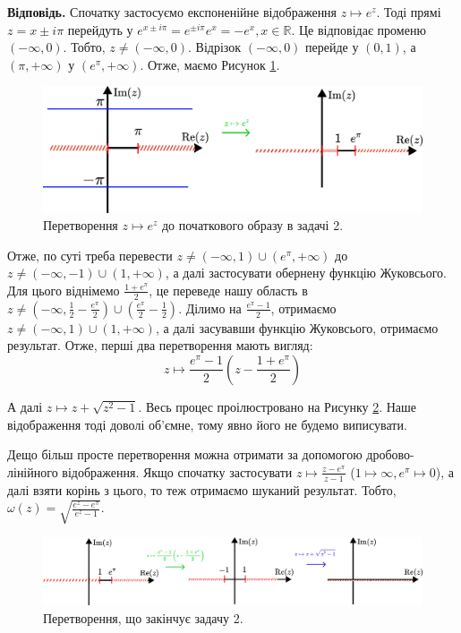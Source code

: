 \documentclass[oneside,solution]{karazin-complan-assign}
\begin{document}
\textbf{Відповідь.} Спочатку застосуємо експоненійне відображення $z \mapsto e^z$. Тоді прямі $z=x\pm i\pi$ перейдуть у $e^{x \pm i\pi} = e^{\pm i\pi}e^x=-e^x, x \in \mathbb{R}$. Це відповідає променю $(-\infty,0)$. Тобто, $z \neq (-\infty,0)$. Відрізок $(-\infty, 0)$ перейде у $(0,1)$, а $(\pi,+\infty)$ у $(e^{\pi},+\infty)$. Отже, маємо Рисунок \ref{fig:2(1)}.

\begin{figure}
    \centering
    \includegraphics[width=\textwidth]{images/test_2/plot_2_1.pdf}
    \caption{Перетворення $z \mapsto e^z$ до початкового образу в задачі 2.}
    \label{fig:2(1)}
\end{figure}

Отже, по суті треба перевести $z \neq (-\infty, 1) \cup (e^{\pi},+\infty)$ до $z \neq (-\infty,-1) \cup (1,+\infty)$, а далі застосувати обернену функцію Жуковсього. Для цього віднімемо $\frac{1+e^{\pi}}{2}$, це переведе нашу область в $z \neq (-\infty, \frac{1}{2}-\frac{e^{\pi}}{2}) \cup (\frac{e^{\pi}}{2} - \frac{1}{2})$. Ділимо на $\frac{e^{\pi}-1}{2}$, отримаємо $z \neq (-\infty, 1) \cup (1,+\infty)$, а далі засувавши функцію Жуковсього, отримаємо результат. Отже, перші два перетворення мають вигляд:
\begin{equation}
    z \mapsto \frac{e^{\pi}-1}{2}\left(z-\frac{1+e^{\pi}}{2}\right)
\end{equation}

А далі $z \mapsto z+\sqrt{z^2-1}$. Весь процес проілюстровано на Рисунку \ref{fig:2(2)}. Наше відображення тоді доволі об'ємне, тому явно його не будемо виписувати.

Дещо більш просте перетворення можна отримати за допомогою дробово-лінійного відображення. Якщо спочатку застосувати $z \mapsto \frac{z-e^{\pi}}{z-1}$ ($1 \mapsto \infty, e^{\pi} \mapsto 0$), а далі взяти корінь з цього, то теж отримаємо шуканий результат. Тобто, $\omega(z) = \sqrt{\frac{e^z - e^{\pi}}{e^{z}-1}}$.

\begin{figure}
    \centering
    \includegraphics[width=\textwidth]{images/test_2/plot_2_2.pdf}
    \caption{Перетворення, що закінчує задачу 2.}
    \label{fig:2(2)}
\end{figure}
\end{document}
